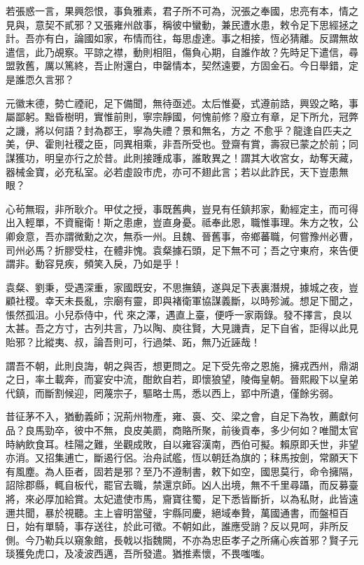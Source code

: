 \begin{pinyinscope}
 若張惑一言，果興怨恨，事負雅素，君子所不可為，況張之奉國，忠亮有本，情之見與，意契不貳邪？又張雍州啟事，稱彼中蠻動，兼民遭水患，敕令足下思經拯之計。吾亦有白，論國如家，布情而往，每思虛達。事之相接，恆必猜離。反謂無故遣信，此乃覘察。平諒之襟，動則相阻，傷負心期，自誰作故？先時足下遣信，尋盟敦舊，厲以篤終，吾止附還白，申罄情本，契然遠要，方固金石。今日舉錯，定是誰恧久言邪？



 元徽末德，勢亡禋祀，足下備聞，無待亟述。太后惟憂，式遵前誥，興毀之略，事屬鄙躬。黜昏樹明，實惟前則，寧宗靜國，何愧前修？廢立有章，足下所允，冠弊之譏，將以何語？封為郡王，寧為失禮？景和無名，方之
 不愈乎？龍逢自匹夫之美，伊、霍則社稷之臣，同異相乘，非吾所受也。登齋有賞，壽寂已蒙之於前；同謀獲功，明皇亦行之於昔。此則接踵成事，誰敢異之！謂其大收宮女，劫奪天藏，器械金寶，必充私室。必若虛設市虎，亦可不翅此言；若以此詐民，天下豈患無眼？



 心茍無瑕，非所耿介。甲仗之授，事既舊典，豈見有任鎮邦家，勳經定主，而可得出入輕單，不資寵衛！斯之患慮，豈直身憂。祗奉此恩，職惟事理。朱方之牧，公卿僉意，吾亦謂微勳之次，無忝一州。且魏、晉舊事，帝鄉蕃職，何嘗豫州必曹，司州必馬？折膠受柱，在體非愧。袁粲據石頭，足下無不可；吾之守東府，來告便謂非。動容見疾，頻笑入戾，乃如是乎！



 袁粲、劉秉，受遇深重，家國既安，不思撫鎮，遂與足下表裏潛規，據城之夜，豈顧社稷。幸天未長亂，宗廟有靈，即與褚衛軍協謀義斷，以時殄滅。想足下聞之，悵然孤沮。小兒忝侍中，代
 來之澤，遇直上臺，便呼一家兩錄。發不擇言，良以太甚。吾之方寸，古列共言，乃以陶、庾往賢，大見譏責，足下自省，詎得以此見貽邪？比縱夷、叔，論吾則可，行過桀、跖，無乃近誣哉！



 謂吾不朝，此則良誨，朝之與否，想更問之。足下受先帝之恩施，擁戎西州，鼎湖之日，率土載奔，而宴安中流，酣飲自若，即懷狼望，陵侮皇朝。晉熙殿下以皇弟代鎮，而斷割候迎，罔蔑宗子，驅略士馬，悉以西上，郢中所遺，僅餘劣弱。



 昔征茅不入，猶動義師；況荊州物產，雍、裛、交、梁之會，自足下為牧，薦獻何品？良馬勁卒，彼中不無，良皮美罽，商賂所聚，前後貢奉，多少何如？唯聞太官時納飲食耳。桂陽之難，坐觀成敗，自以雍容漢南，西伯可擬。賴原即夭世，非望亦消。又招集逋亡，斷遏行侶。治舟試艦，恆以朝廷為旗的；秣馬按劍，常願天下有風塵。為人臣者，固若是邪？至乃不遵制書，敕下如空，國思莫行，命令擁隔，
 詔除郡縣，輒自板代，罷官去職，禁還京師。凶人出境，無不千里尋躡，而反募臺將，來必厚加給賞。太妃遣使市馬，齎寶往蜀，足下悉皆斷折，以為私財，此皆遠邇共聞，暴於視聽。主上睿明當璧，宇縣同慶，絕域奉贄，萬國通書，而盤桓百日，始有單騎，事存送往，於此可徵。不朝如此，誰應受誚？反以見呵，非所反側。今乃勒兵以窺象館，長戟以指魏闕，不亦為忠臣孝子之所痛心疾首邪？賢子元琰獲免虎口，及凌波西邁，吾所發遣。猶推素懷，不畏嗤嗤。




\end{pinyinscope}
